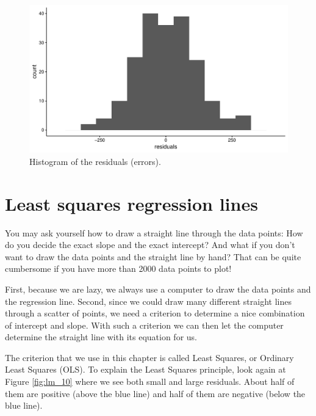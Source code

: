 \documentclass[]{book}\usepackage[]{graphicx}\usepackage[]{color}
\makeatletter
\def\maxwidth{ %
  \ifdim\Gin@nat@width>\linewidth
    \linewidth
  \else
    \Gin@nat@width
  \fi
}
\newenvironment{knitrout}{}{} %
\makeatother
\begin{document}
\begin{knitrout}
\color{fgcolor}\begin{figure}

{\centering \includegraphics[width=\maxwidth]{figure/lm_11-1} 

}

\caption[Histogram of the residuals (errors)]{Histogram of the residuals (errors).}\label{fig:lm_11}
\end{figure}


\end{knitrout}


\section{Least squares regression lines}


You may ask yourself how to draw a straight line through the data points: How do you decide the exact slope and the exact intercept? And what if you don't want to draw the data points and the straight line by hand? That can be quite cumbersome if you have more than 2000 data points to plot!

First, because we are lazy, we always use a computer to draw the data points and the regression line. Second, since we could draw many different straight lines through a scatter of points, we need a criterion to determine a nice combination of intercept and slope. With such a criterion we can then let the computer determine the straight line with its equation for us.

The criterion that we use in this chapter is called Least Squares, or Ordinary Least Squares (OLS). To explain the Least Squares principle, look again at Figure \ref{fig:lm_10} where we see both small and large residuals. About half of them are positive (above the blue line) and half of them are negative (below the blue line).
\end{document}
